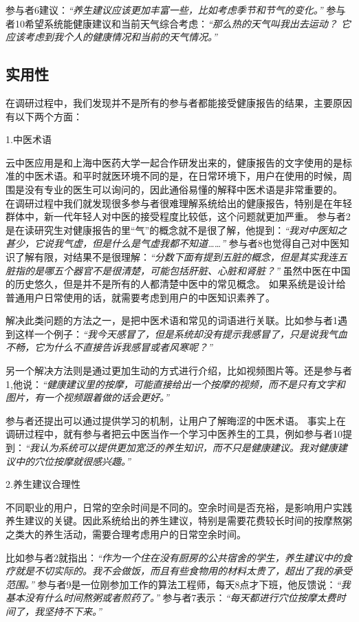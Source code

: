 参与者6建议：\textit{“养生建议应该更加丰富一些，比如考虑季节和节气的变化。”} 
参与者10希望系统能健康建议和当前天气综合考虑：\textit{“那么热的天气叫我出去运动？ 它应该考虑到我个人的健康情况和当前的天气情况。”}

\subsection{实用性}
在调研过程中，我们发现并不是所有的参与者都能接受健康报告的结果，主要原因有以下两个方面：

1.中医术语

云中医应用是和上海中医药大学一起合作研发出来的，健康报告的文字使用的是标准的中医术语。和平时就医环境不同的是，在日常环境下，用户在使用的时候，周围是没有专业的医生可以询问的，因此通俗易懂的解释中医术语是非常重要的。
在调研过程中我们就发现很多参与者很难理解系统给出的健康报告，特别是在年轻群体中，新一代年轻人对中医的接受程度比较低，这个问题就更加严重。
参与者2是在读研究生对健康报告的里“气”的概念就不是很了解，他提到：\textit{“我对中医知之甚少，它说我气虚，但是什么是气虚我都不知道……”}
参与者8也觉得自己对中医知识了解有限，对结果不是很理解：\textit{“分数下面有提到五脏的概念，但是其实我连五脏指的是哪五个器官不是很清楚，可能包括肝脏、心脏和肾脏？”}
虽然中医在中国的历史悠久，但是并不是所有的人都清楚中医中的常见概念。 如果系统是设计给普通用户日常使用的话，就需要考虑到用户的中医知识素养了。

解决此类问题的方法之一，是把中医术语和常见的词语进行关联。比如参与者1遇到这样一个例子：\textit{“我今天感冒了，但是系统却没有提示我感冒了，只是说我气血不畅，它为什么不直接告诉我感冒或者风寒呢？”}

另一个解决方法则是通过更加生动的方式进行介绍，比如视频图片等。还是参与者1,他说：\textit{“健康建议里的按摩，可能直接给出一个按摩的视频，而不是只有文字和图片，有一个视频跟着做的话会更好。”}

参与者还提出可以通过提供学习的机制，让用户了解晦涩的中医术语。
事实上在调研过程中，就有参与者把云中医当作一个学习中医养生的工具，例如参与者10提到：\textit{“我认为系统可以提供更加宽泛的养生知识，而不只是健康建议。我对健康建议中的穴位按摩就很感兴趣。”}

2.养生建议合理性

不同职业的用户，日常的空余时间是不同的。空余时间是否充裕，是影响用户实践养生建议的关键。因此系统给出的养生建议，特别是需要花费较长时间的按摩熬粥之类大的养生活动，需要合理考虑用户的日常空余时间。

比如参与者2就指出：\textit{“作为一个住在没有厨房的公共宿舍的学生，养生建议中的食疗就是不切实际的。我不会做饭，而且有些食物用的材料太贵了，超出了我的承受范围。”}
参与者9是一位刚参加工作的算法工程师，每天8点才下班，他反馈说：\textit{“我基本没有什么时间熬粥或者煎药了。”} 参与者7表示：\textit{“每天都进行穴位按摩太费时间了，我坚持不下来。”}

